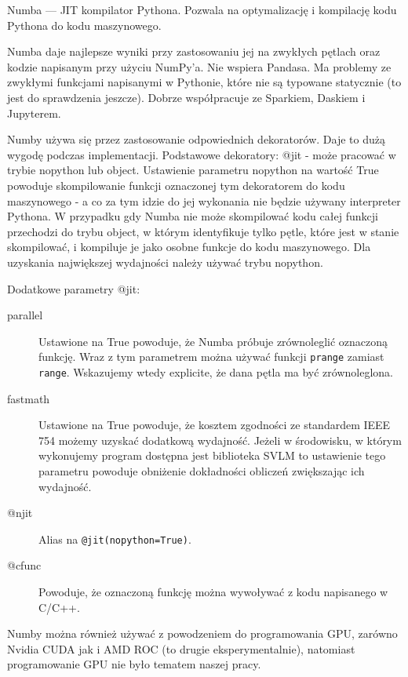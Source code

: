 Numba --- JIT kompilator Pythona.
Pozwala na optymalizację i kompilację  kodu Pythona do kodu maszynowego.

Numba daje najlepsze wyniki przy zastosowaniu jej na zwykłych pętlach
oraz kodzie napisanym przy użyciu NumPy’a.
Nie wspiera Pandasa.
Ma problemy ze zwykłymi funkcjami napisanymi w Pythonie, które nie są
typowane statycznie (to jest do sprawdzenia jeszcze).
Dobrze współpracuje ze Sparkiem, Daskiem i Jupyterem.

Numby używa się przez zastosowanie odpowiednich dekoratorów.
Daje to dużą wygodę podczas implementacji.
Podstawowe dekoratory:
@jit - może pracować w trybie nopython lub object.
Ustawienie parametru nopython na wartość True powoduje skompilowanie
funkcji oznaczonej tym dekoratorem do kodu maszynowego - a co za tym idzie
do jej wykonania nie będzie używany interpreter Pythona.
W przypadku gdy Numba nie może skompilować kodu całej funkcji
przechodzi do trybu object, w którym identyfikuje tylko pętle,
które jest w stanie skompilować, i kompiluje je jako osobne funkcje
do kodu maszynowego.
Dla uzyskania największej wydajności należy używać trybu nopython.

Dodatkowe parametry @jit:
\begin{description}
    \item [parallel]
    Ustawione na True powoduje, że Numba próbuje
    zrównoleglić oznaczoną funkcję.
    Wraz z tym parametrem można używać funkcji \texttt{prange}
    zamiast \texttt{range}.
    Wskazujemy wtedy explicite, że dana pętla ma być zrównoleglona.
    \item [fastmath]
    Ustawione na True powoduje, że kosztem zgodności
    ze standardem IEEE 754 możemy uzyskać dodatkową wydajność.
    Jeżeli w środowisku, w którym wykonujemy program dostępna jest
    biblioteka SVLM to ustawienie tego parametru powoduje obniżenie
    dokładności obliczeń zwiększając ich wydajność.
    \item [@njit]
    Alias na \texttt{@jit(nopython=True)}.
    \item [@cfunc]
    Powoduje, że oznaczoną funkcję można wywoływać z kodu napisanego w C/C++.
\end{description}

Numby można również używać z powodzeniem do programowania GPU,
zarówno Nvidia CUDA jak i AMD ROC (to drugie eksperymentalnie),
natomiast programowanie GPU nie było tematem naszej pracy.
